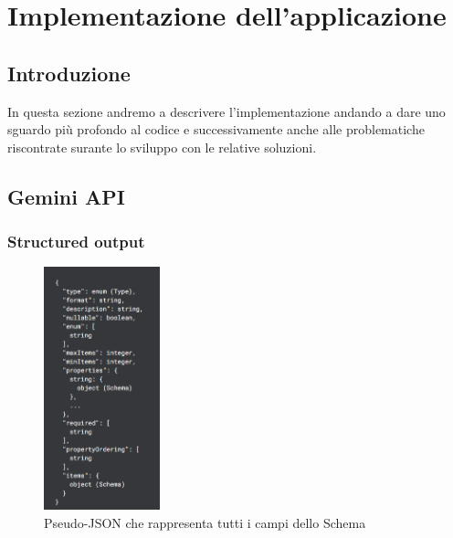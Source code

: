 \chapter{Implementazione dell'applicazione}
\pagestyle{plain}


\section{Introduzione}
In questa sezione andremo a descrivere l'implementazione andando a dare uno sguardo più profondo al codice e successivamente anche alle problematiche riscontrate surante lo sviluppo con le relative soluzioni.


\section{Gemini API}
\subsection{Structured output}

\begin{figure} %
    \centering
    \includegraphics[width=0.30\textwidth]{figures/chapter_1/geminiPseudoSchema.png}
    \caption{Pseudo-JSON che rappresenta tutti i campi dello Schema}
\end{figure}

